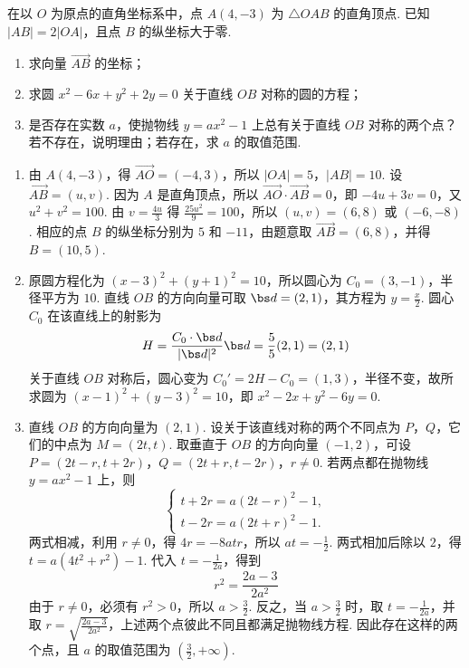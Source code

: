 \begin{problem}
在以 \(O\) 为原点的直角坐标系中，点 \(A(4, -3)\) 为 \(\triangle OAB\) 的直角顶点. 已知 \(|AB| = 2|OA|\)，且点 \(B\) 的纵坐标大于零.

\begin{enumerate}
\item 求向量 \(\overrightarrow{AB}\) 的坐标；
\item 求圆 \(x^{2} - 6x + y^{2} + 2y = 0\) 关于直线 \(OB\) 对称的圆的方程；
\item 是否存在实数 \(a\)，使抛物线 \(y = ax^2 - 1\) 上总有关于直线 \(OB\) 对称的两个点？若不存在，说明理由；若存在，求 \(a\) 的取值范围.
\end{enumerate}
\end{problem}

\begin{solution}
\begin{enumerate}
\item 由 \(A(4,-3)\)，得 \(\overrightarrow{AO}=(-4,3)\)，所以 \(|OA|=5\)，\(|AB|=10\). 设 \(\overrightarrow{AB}=(u,v)\). 因为 \(A\) 是直角顶点，所以 \(\overrightarrow{AO}\cdot\overrightarrow{AB}=0\)，即 \(-4u+3v=0\)，又 \(u^2+v^2=100\). 由 \(v=\frac{4u}{3}\) 得 \(\frac{25u^2}{9}=100\)，所以 \((u,v)=(6,8)\) 或 \((-6,-8)\). 相应的点 \(B\) 的纵坐标分别为 \(5\) 和 \(-11\)，由题意取 \(\overrightarrow{AB}=(6,8)\)，并得 \(B=(10,5)\).
\item 原圆方程化为 \((x-3)^2+(y+1)^2=10\)，所以圆心为 \(C_0=(3,-1)\)，半径平方为 \(10\). 直线 \(OB\) 的方向向量可取 \(\bs d=(2,1)\)，其方程为 \(y=\frac{x}{2}\). 圆心 \(C_0\) 在该直线上的射影为
\[
H=\frac{C_0\cdot\bs d}{|\bs d|^2}\bs d=\frac{5}{5}(2,1)=(2,1)
\]
关于直线 \(OB\) 对称后，圆心变为 \(C_0'=2H-C_0=(1,3)\)，半径不变，故所求圆为 \((x-1)^2+(y-3)^2=10\)，即 \(x^2-2x+y^2-6y=0\).
\item 直线 \(OB\) 的方向向量为 \((2,1)\). 设关于该直线对称的两个不同点为 \(P\)，\(Q\)，它们的中点为 \(M=(2t,t)\). 取垂直于 \(OB\) 的方向向量 \((-1,2)\)，可设
\(P=(2t-r,t+2r)\)，\(Q=(2t+r,t-2r)\)，\(r\neq0\).
若两点都在抛物线 \(y=ax^2-1\) 上，则
\[
\begin{cases}
t+2r=a(2t-r)^2-1,\\
t-2r=a(2t+r)^2-1.
\end{cases}
\]
两式相减，利用 \(r\neq0\)，得 \(4r=-8atr\)，所以 \(at=-\frac12\). 两式相加后除以 \(2\)，得 \(t=a(4t^2+r^2)-1\). 代入 \(t=-\frac{1}{2a}\)，得到
\[
r^2=\frac{2a-3}{2a^2}
\]
由于 \(r\neq0\)，必须有 \(r^2>0\)，所以 \(a>\frac32\). 反之，当 \(a>\frac32\) 时，取 \(t=-\frac{1}{2a}\)，并取 \(r=\sqrt{\frac{2a-3}{2a^2}}\)，上述两个点彼此不同且都满足抛物线方程. 因此存在这样的两个点，且 \(a\) 的取值范围为 \(\left(\frac32,+\infty\right)\).
\end{enumerate}
\end{solution}

